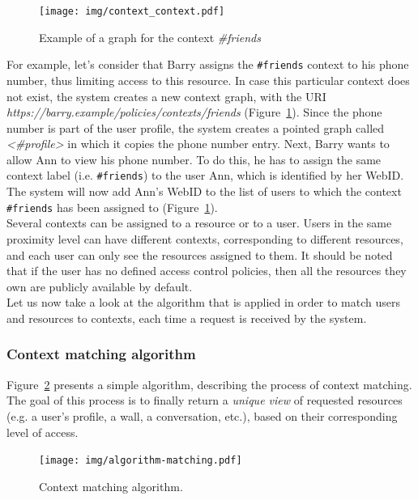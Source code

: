 \begin{figure}[h]
  \begin{center}
    \texttt{[image: img/context\_context.pdf]}
        \caption{Example of a graph for the context \textit{\#friends}}
        \label{fig:context_context}
  \end{center}
\end{figure}

For example, let's consider that Barry assigns the \verb+#friends+ context to his phone number, thus limiting access to this resource. In case this particular context does not exist, the system creates a new context graph, with the URI \textit{https://barry.example/policies/contexts/friends} (Figure~\ref{fig:context_context}). Since the phone number is part of the user profile, the system creates a pointed graph called \textit{<\#profile>} in which it copies the phone number entry. Next, Barry wants to allow Ann to view his phone number. To do this, he has to assign the same context label (i.e. \verb+#friends+) to the user Ann, which is identified by her WebID. The system will now add Ann's WebID to the list of users to which the context \verb+#friends+ has been assigned to (Figure~\ref{fig:context_context}).\\

Several contexts can be assigned to a resource or to a user. Users in the same proximity level can have different contexts, corresponding to different resources, and each user can only see the resources assigned to them. It should be noted that if the user has no defined access control policies, then all the resources they own are publicly available by default.\\

Let us now take a look at the algorithm that is applied in order to match users and resources to contexts, each time a request is received by the system.


\subsubsection{Context matching algorithm}
\label{subsec:context_algo}
Figure~\ref{fig:context_matching} presents a simple algorithm, describing the process of context matching. The goal of this process is to finally return a \textit{unique view} of requested resources (e.g. a user's profile, a wall, a conversation, etc.), based on their corresponding level of access.\\

\begin{figure}[h]
  \begin{center}
    \texttt{[image: img/algorithm-matching.pdf]}
        \caption{Context matching algorithm.}
        \label{fig:context_matching}
  \end{center}
\end{figure}

